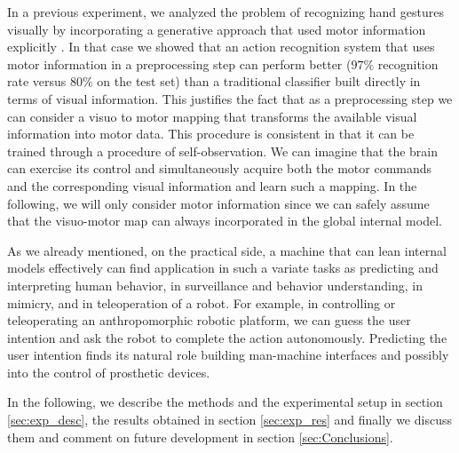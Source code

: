 In a previous experiment, we analyzed the problem of recognizing hand gestures visually
by incorporating a generative approach that used motor information explicitly 
\cite{lopes-05,metta-06}.
In that case we showed that an action recognition system that uses motor information in
a preprocessing step can perform better ($97\%$ recognition rate versus $80\%$ on the test
set) than a traditional classifier built directly in terms of visual information. This 
justifies the fact that as a preprocessing step we can consider a visuo to motor mapping that 
transforms the available visual information into motor data. This procedure is consistent 
in that it can be trained through a procedure of self-observation. We can imagine that 
the brain can exercise its control and simultaneously acquire both the motor commands and 
the corresponding visual information and learn such a mapping. In the following, we 
will only consider motor information since we can safely assume that the visuo-motor map
can always incorporated in the global internal model.

As we already mentioned, on the practical side, a machine that can lean internal models 
effectively can find application in such a variate tasks as predicting and interpreting 
human behavior, in surveillance and behavior understanding, in mimicry, and in 
teleoperation of a robot. For example, in controlling or teleoperating an anthropomorphic 
robotic platform, we can guess the user intention and ask the robot to complete the 
action autonomously. Predicting the user intention finds its natural role building 
man-machine interfaces and possibly into the control of prosthetic devices.

In the following, we describe the methods and the experimental setup in section 
\ref{sec:exp_desc}, the results obtained in section \ref{sec:exp_res} and finally we 
discuss them and comment on future development in section \ref{sec:Conclusions}.



